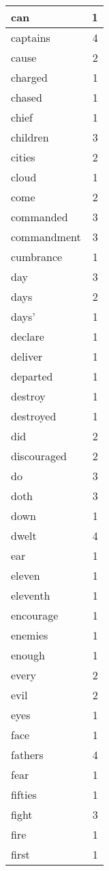 \begin{center}
\begin{longtable}{l|r}
can & 1 \\ \hline
captains & 4 \\ \hline
cause & 2 \\ \hline
charged & 1 \\ \hline
chased & 1 \\ \hline
chief & 1 \\ \hline
children & 3 \\ \hline
cities & 2 \\ \hline
cloud & 1 \\ \hline
come & 2 \\ \hline
commanded & 3 \\ \hline
commandment & 3 \\ \hline
cumbrance & 1 \\ \hline
day & 3 \\ \hline
days & 2 \\ \hline
days' & 1 \\ \hline
declare & 1 \\ \hline
deliver & 1 \\ \hline
departed & 1 \\ \hline
destroy & 1 \\ \hline
destroyed & 1 \\ \hline
did & 2 \\ \hline
discouraged & 2 \\ \hline
do & 3 \\ \hline
doth & 3 \\ \hline
down & 1 \\ \hline
dwelt & 4 \\ \hline
ear & 1 \\ \hline
eleven & 1 \\ \hline
eleventh & 1 \\ \hline
encourage & 1 \\ \hline
enemies & 1 \\ \hline
enough & 1 \\ \hline
every & 2 \\ \hline
evil & 2 \\ \hline
eyes & 1 \\ \hline
face & 1 \\ \hline
fathers & 4 \\ \hline
fear & 1 \\ \hline
fifties & 1 \\ \hline
fight & 3 \\ \hline
fire & 1 \\ \hline
first & 1 \\ \hline

\end{longtable}
\end{center}
